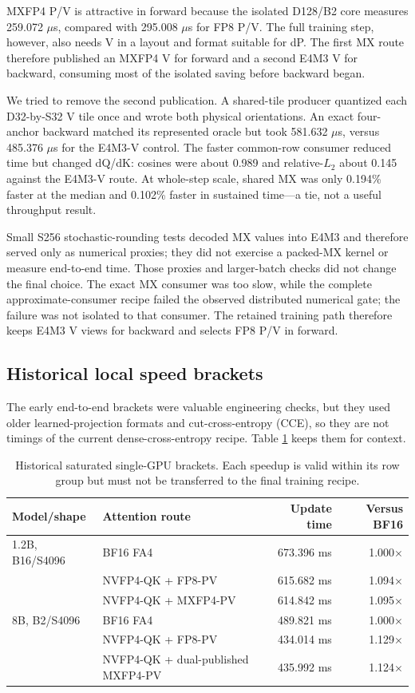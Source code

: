 MXFP4 P/V is attractive in forward because the isolated D128/B2 core measures
259.072 $\mu$s, compared with 295.008 $\mu$s for FP8 P/V.  The full training
step, however, also needs V in a layout and format suitable for dP.  The first
MX route therefore published an MXFP4 V for forward and a second E4M3 V for
backward, consuming most of the isolated saving before backward began.

We tried to remove the second publication.  A shared-tile producer quantized
each D32-by-S32 V tile once and wrote both physical orientations.  An exact
four-anchor backward matched its represented oracle but took 581.632 $\mu$s,
versus 485.376 $\mu$s for the E4M3-V control.  The faster common-row consumer
reduced time but changed dQ/dK: cosines were about 0.989 and relative-$L_2$
about 0.145 against the E4M3-V route.  At whole-step scale, shared MX was only
0.194\% faster at the median and 0.102\% faster in sustained time---a tie, not
a useful throughput result.

Small S256 stochastic-rounding tests decoded MX values into E4M3 and therefore
served only as numerical proxies; they did not exercise a packed-MX kernel or
measure end-to-end time.  Those proxies and larger-batch checks did not change
the final choice.  The exact MX consumer was too slow, while the complete
approximate-consumer recipe failed the observed distributed numerical gate;
the failure was not isolated to that consumer.  The retained training path
therefore keeps E4M3 V views for backward and selects FP8 P/V in forward.

\subsection{Historical local speed brackets}

The early end-to-end brackets were valuable engineering checks, but they used
older learned-projection formats and cut-cross-entropy (CCE), so they are not
timings of the current dense-cross-entropy recipe.  Table
\ref{tab:historical-local-brackets} keeps them for context.

\begin{table}[htbp]
\centering
\caption{Historical saturated single-GPU brackets.  Each speedup is valid
within its row group but must not be transferred to the final training recipe.}
\label{tab:historical-local-brackets}
\small
\begin{tabular}{llrr}
\toprule
Model/shape & Attention route & Update time & Versus BF16 \\
\midrule
1.2B, B16/S4096 & BF16 FA4 & 673.396 ms & 1.000$\times$ \\
 & NVFP4-QK + FP8-PV & 615.682 ms & 1.094$\times$ \\
 & NVFP4-QK + MXFP4-PV & 614.842 ms & 1.095$\times$ \\
\midrule
8B, B2/S4096 & BF16 FA4 & 489.821 ms & 1.000$\times$ \\
 & NVFP4-QK + FP8-PV & 434.014 ms & 1.129$\times$ \\
 & NVFP4-QK + dual-published MXFP4-PV & 435.992 ms & 1.124$\times$ \\
\bottomrule
\end{tabular}
\end{table}
\FloatBarrier


